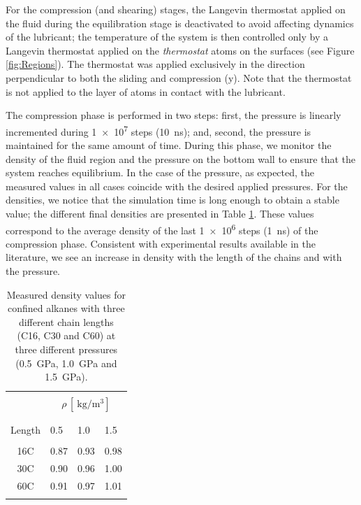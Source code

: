 \documentclass[aps,prb,reprint,superscriptaddress, a4paper]{revtex4-1}
\begin{document}
For the compression (and shearing) stages, the Langevin thermostat applied on the fluid during the equilibration stage is deactivated to avoid affecting dynamics of the lubricant;  the temperature of the system is then controlled only by a Langevin thermostat applied on the  \textit{thermostat} atoms on the surfaces (see Figure \ref{fig:Regions}). The thermostat  was applied exclusively in the direction perpendicular to both the sliding and compression (y). Note that the thermostat is not applied to the layer of atoms in contact with the lubricant.

The compression phase is performed in two steps: first, the pressure  is linearly incremented during  \SI{1e7}{} steps (\SI{10}{\nano\second}); and, second,  the pressure is maintained for the same amount of time. During this phase, we monitor the density of  the fluid region and the  pressure  on the bottom wall to  ensure that the system reaches equilibrium. In the case of the pressure, as expected, the measured values in all cases coincide with the desired applied pressures. For the densities,  we notice that the simulation time is long enough to obtain a stable value; the different final densities are presented in Table \ref{tab:rho}. These values  correspond to the average density of the last  \SI{1e6}{} steps (\SI{1}{\nano\second})  of the compression phase. Consistent with experimental results available in the literature\cite{Griesbaum2000}, we see an increase in density with the length of the chains and with the pressure.


\begin{table}
	\caption{Measured density values for confined alkanes  with three different chain lengths (C16, C30 and C60) at three different pressures (\SI{0.5}{\giga\pascal}, \SI{1.0}{\giga\pascal} and \SI{1.5}{\giga\pascal}).}   
	\centering     
	\begin{tabular}{c | l l  l}
		\hline\hline\\ [-2ex]

		
										&	\multicolumn{3}{c}{ $\rho \, [\SI{}{\kilogram\per\cubic\meter}]$} \\

		\hline\\ [-2ex]
		\backslashbox{Chain \\ Length}{P $[\SI{}{\giga\pascal}]$}	&	0.5		&	1.0		&	1.5	\\

		\hline\\ [-2ex]
		16C								&	0.87	&	0.93	&	0.98	\\
		30C								&	0.90	&	0.96	&	1.00	\\	
		60C								&	0.91	&	0.97	&	1.01	\\	

		\hline\hline    \\[-2ex]
	\end{tabular}
	\label{tab:rho}  
\end{table}
\end{document}
